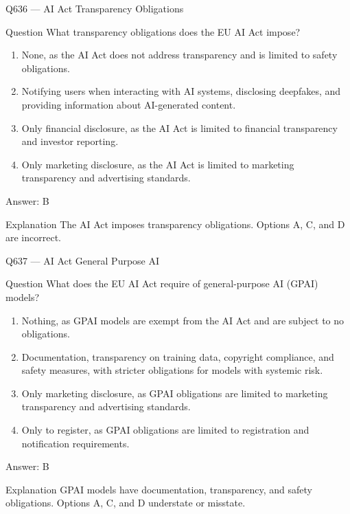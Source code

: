 \documentclass[aspectratio=169,8pt]{beamer}
\begin{document}
	\begin{frame}{Q636 --- AI Act Transparency Obligations}
		\begin{block}{Question}
			What transparency obligations does the EU AI Act impose?
			\begin{enumerate}
				\item None, as the AI Act does not address transparency and is limited to safety obligations.
				\item Notifying users when interacting with AI systems, disclosing deepfakes, and providing information about AI-generated content.
				\item Only financial disclosure, as the AI Act is limited to financial transparency and investor reporting.
				\item Only marketing disclosure, as the AI Act is limited to marketing transparency and advertising standards.
			\end{enumerate}
		\end{block}
		\begin{exampleblock}{Answer: B}\end{exampleblock}
		\begin{block}{Explanation}
			The AI Act imposes transparency obligations. Options A, C, and D are incorrect.
		\end{block}
	\end{frame}
	
	\begin{frame}{Q637 --- AI Act General Purpose AI}
		\begin{block}{Question}
			What does the EU AI Act require of general-purpose AI (GPAI) models?
			\begin{enumerate}
				\item Nothing, as GPAI models are exempt from the AI Act and are subject to no obligations.
				\item Documentation, transparency on training data, copyright compliance, and safety measures, with stricter obligations for models with systemic risk.
				\item Only marketing disclosure, as GPAI obligations are limited to marketing transparency and advertising standards.
				\item Only to register, as GPAI obligations are limited to registration and notification requirements.
			\end{enumerate}
		\end{block}
		\begin{exampleblock}{Answer: B}\end{exampleblock}
		\begin{block}{Explanation}
			GPAI models have documentation, transparency, and safety obligations. Options A, C, and D understate or misstate.
		\end{block}
	\end{frame}
	
\end{document}
